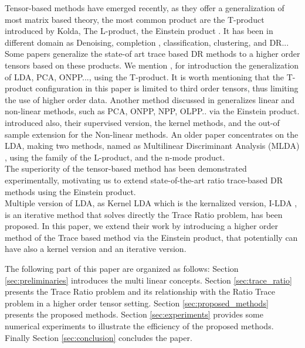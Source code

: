 \documentclass{siamltex}
\begin{document}
Tensor-based methods have emerged recently, as they offer a generalization of most matrix based theory, the most common product are the T-product \cite{Kolda2009} introduced by Kolda, The L-product, the Einstein product \cite{Brazell2013}. It has been in different domain as Denoising, completion \cite{zahir2024quaternion}, classification, clustering, \cite{zahir2023multilinear} and DR...\\
Some papers generalize the state-of art trace based DR methods to a higher order tensors based on these products.
We mention \cite{bouallala2024trace}, for introduction the generalization of LDA, PCA, ONPP..., using the T-product. It is worth mentioning that the T-product configuration in this paper is limited to third order tensors, thus limiting the use of higher order data. Another method discussed in \cite{zahir2024higher} generalizes linear and non-linear methods, such as PCA, ONPP, NPP, OLPP.. via the Einstein product. \cite{zahir2024higher} introduced also, their supervised version, the kernel methods, and the out-of sample extension for the Non-linear methods. An older paper concentrates on the LDA, making two methods, named as Multilinear Discriminant Analysis (MLDA) \cite{dufrenois2023multilinear}, using the family of the L-product, and the n-mode product.\\
The superiority of the tensor-based method has been demonstrated experimentally, motivating us to extend state-of-the-art ratio trace-based DR methods using the Einstein product.\\
Multiple version of LDA, as Kernel LDA \cite{mika1999fisher} which is the kernalized version, I-LDA \cite{wang2007trace}, is an iterative method that solves directly the Trace Ratio problem, has been proposed. 
In this paper, we extend their work by introducing a higher order method of the Trace based method via the Einstein product, that potentially can have also a kernel version and an iterative version.

The following part of this paper are organized as follows: Section \ref{sec:preliminaries} introduces the multi linear concepts. Section \ref{sec:trace_ratio} presents the Trace Ratio problem and its relationship with the Ratio Trace problem in a higher order tensor setting. Section \ref{sec:proposed_methods} presents the proposed methods. Section \ref{sec:experiments} provides some numerical experiments to illustrate the efficiency of the proposed methods. Finally Section \ref{sec:conclusion} concludes the paper.
\end{document}
